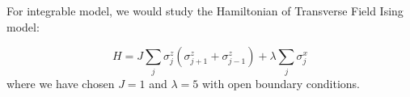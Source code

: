 \documentclass[11pt,a4paper]{article}
\begin{document}
%


%
%
%
%
%

For integrable model, we would study the Hamiltonian of Transverse Field Ising model:

\begin{equation}
H= J \sum_{j} \sigma_j^z(\sigma_{j+1}^z+ \sigma_{j-1}^z) + \lambda \sum_{j} \sigma_j^x
\end{equation}
where we have chosen $J=1$ and $\lambda=5$ with open boundary conditions.
\end{document}

